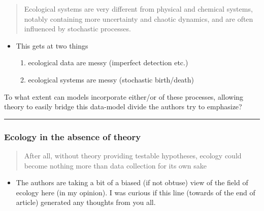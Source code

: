 \documentclass[
]{article}
\providecommand{\tightlist}{%
  \setlength{\itemsep}{0pt}\setlength{\parskip}{0pt}}
\begin{document}
\begin{quote}
Ecological systems are very different from physical and chemical
systems, notably containing more uncertainty and chaotic dynamics, and
are often influenced by stochastic processes.
\end{quote}

\begin{itemize}
\tightlist
\item
  This gets at two things

  \begin{enumerate}
  \def\labelenumi{\arabic{enumi}.}
  \tightlist
  \item
    ecological data are messy (imperfect detection etc.)
  \item
    ecological systems are messy (stochastic birth/death)
  \end{enumerate}
\end{itemize}

To what extent can models incorporate either/or of these processes,
allowing theory to easily bridge this data-model divide the authors try
to emphasize?

\begin{center}\rule{0.5\linewidth}{0.5pt}\end{center}

\hypertarget{ecology-in-the-absence-of-theory}{%
\subsubsection{Ecology in the absence of
theory}\label{ecology-in-the-absence-of-theory}}

\begin{quote}
After all, without theory providing testable hypotheses, ecology could
become nothing more than data collection for its own sake
\end{quote}

\begin{itemize}
\tightlist
\item
  The authors are taking a bit of a biased (if not obtuse) view of the
  field of ecology here (in my opinion). I was curious if this line
  (towards of the end of article) generated any thoughts from you all.
\end{itemize}
\end{document}

